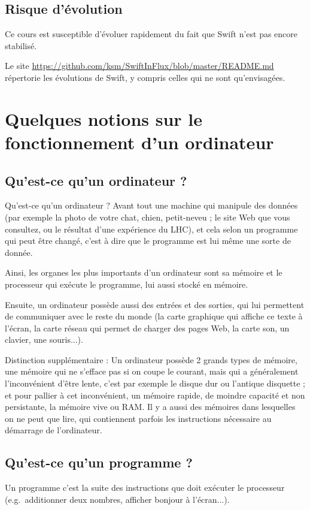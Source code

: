 \subsection{Risque d’évolution}
Ce cours est susceptible d'évoluer rapidement du fait que Swift n'est pas encore stabilisé.

Le site \url{https://github.com/ksm/SwiftInFlux/blob/master/README.md}  répertorie les
évolutions de Swift, y compris celles qui ne sont qu’envisagées.
\section{Quelques notions sur le fonctionnement d'un ordinateur}
\subsection{Qu'est-ce qu'un ordinateur ?}
Qu'est-ce qu'un ordinateur ? Avant tout une machine qui manipule des données (par
exemple la photo de votre chat, chien, petit-neveu ; le site Web que vous consultez, ou le
résultat d'une expérience du LHC), et cela selon un programme qui peut être changé,
c'est à dire que le programme est lui même une sorte de donnée.

Ainsi, les organes les plus importants d'un ordinateur sont sa mémoire et le processeur
qui exécute le programme, lui aussi stocké en mémoire.

Ensuite, un ordinateur possède aussi des entrées et des sorties, qui lui permettent de
communiquer avec le reste du monde (la carte graphique qui affiche ce texte à l'écran, la
carte réseau qui permet de charger des pages Web, la carte son, un clavier, une souris...).

Distinction supplémentaire : Un ordinateur possède 2 grands types de mémoire, une
mémoire qui ne s'efface pas si on coupe le courant, mais qui a généralement
l'inconvénient d'être lente, c'est par exemple le disque dur ou l'antique disquette ; et pour
pallier à cet inconvénient, un mémoire rapide, de moindre capacité et non persistante, la
mémoire vive ou RAM. Il y a aussi des mémoires dans lesquelles on ne peut que lire, qui
contiennent parfois les instructions nécessaire au démarrage de l'ordinateur.
\subsection{Qu'est-ce qu'un programme ?}
Un programme c'est la suite des instructions que doit exécuter le processeur
(e.g.\ additionner deux nombres, afficher bonjour à l'écran...).

